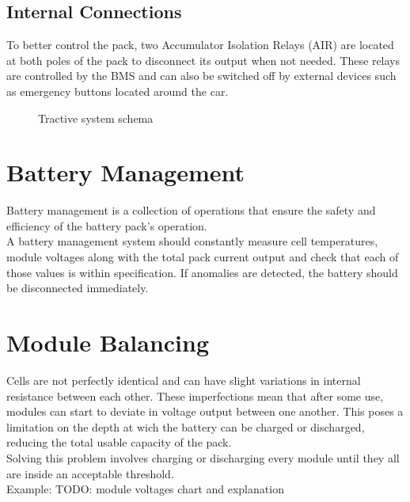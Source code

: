 \subsection{Internal Connections}
To better control the pack, two Accumulator Isolation Relays (AIR) \cite[EV 5.6]{fsg2020} are located at both poles of the pack to disconnect its output when not needed. These relays are controlled by the BMS and can also be switched off by external devices such as emergency buttons located around the car.
\begin{figure}[h]
    \centering
    
    \caption{Tractive system schema}
    \label{fig:tractive_system_detail}
\end{figure}

\section{Battery Management}
Battery management is a collection of operations that ensure the safety and efficiency of the battery pack's operation.\\
A battery management system should constantly measure cell temperatures, module voltages along with the total pack current output and check that each of those values is within specification. If anomalies are detected, the battery should be disconnected immediately.

\section {Module Balancing}
Cells are not perfectly identical and can have slight variations in internal resistance between each other. These imperfections mean that after some use, modules can start to deviate in voltage output between one another. This poses a limitation on the depth at wich the battery can be charged or discharged, reducing the total usable capacity of the pack.\\
Solving this problem involves charging or discharging every module until they all are inside an acceptable threshold.\\
Example:
TODO: module voltages chart and explanation

